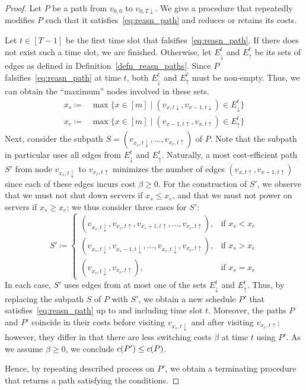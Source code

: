 \begin{proof}
Let $P$ be a path from $v_{0,0}$ to $v_{0,T\downarrow}$. We give a procedure that repeatedly modifies $P$ such that it satisfies~\eqref{eq:reasn_path} and reduces or retains its costs. 

Let $t\in[T-1]$ be the first time slot that falsifies~\eqref{eq:reasn_path}. If there does not exist such a time slot, we are finished. Otherwise, let $E_\downarrow^t$ and $E_\uparrow^t$ be its sets of edges as defined in Definition~\ref{defn_reasn_paths}. Since $P$ falsifies~\eqref{eq:reasn_path} at time $t$, both $E_\downarrow^t$ and $E_\uparrow^t$ must be non-empty. Thus, we can obtain the ``maximum'' nodes involved in these sets.
\begin{align*}
	x_s\coloneqq&\max\bigl\{x\in[m]\mid (v_{x,t\downarrow},v_{x-1,t\downarrow})\in E_\downarrow^t\bigr\}\\
	x_e\coloneqq&\max\bigl\{x\in[m]\mid (v_{x-1,t\uparrow},v_{x,t\uparrow})\in E_\uparrow^t\bigr\}
\end{align*}
Next, consider the subpath $S=(v_{x_s,t\downarrow},\ldots,v_{x_e,t\uparrow})$ of $P$. Note that the subpath in particular uses all edges from $E_\downarrow^t$ and $E_\uparrow^t$.
Naturally, a most cost-efficient path $S'$ from node $v_{x_s,t\downarrow}$ to $v_{x_e,t\uparrow}$ minimizes the number of edges $(v_{x,t\uparrow},v_{x+1,t\uparrow})$ since each of these edges incurs cost $\beta\ge 0$. For the construction of $S'$, we observe that we must not shut down servers if $x_s\le x_e$, and that we must not power on servers if $x_s\ge x_e$; we thus consider three cases for $S'$:
\begin{equation*}
	S'\coloneqq
	\begin{cases}
		(v_{x_s,t\downarrow},v_{x_s,t\uparrow},v_{x_s+1,t\uparrow},\ldots,v_{x_e,t\uparrow}), & \text{if $x_s< x_e$}\\
		(v_{x_s,t\downarrow},v_{x_s-1,t\downarrow},\ldots,v_{x_e,t\downarrow},v_{x_e,t\uparrow}), & \text{if $x_s>x_e$}\\
		(v_{x_s,t\downarrow},v_{x_e,t\uparrow}), & \text{if $x_s=x_e$}
	\end{cases}
\end{equation*}
In each case, $S'$ uses edges from at most one of the sets $E_\downarrow^t$ and $E_\uparrow^t$. Thus, by replacing the subpath $S$ of $P$ with $S'$, we obtain a new schedule $P'$ that satisfies~\eqref{eq:reasn_path} up to and including time slot $t$. Moreover, the paths $P$ and $P'$ coincide in their costs before visiting $v_{x_s,t\downarrow}$ and after visiting $v_{x_e,t\uparrow}$; however, they differ in that there are less switching costs $\beta$ at time $t$ using $P'$. As we assume $\beta\ge0$, we conclude $c(P')\le c(P)$.

Hence, by repeating described process on $P'$, we obtain a terminating procedure that returns a path satisfying the conditions.
\end{proof}
